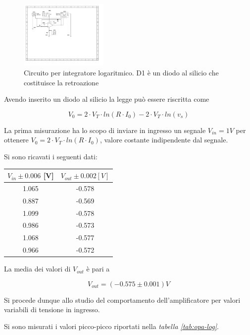 \documentclass[journal]{IEEEtran}
\begin{document}
\begin{figure}[H]%
\begin {center}
\includegraphics[width=0.38\textwidth]{sch-simulations/output/OPA-log.pdf}
\caption{Circuito per integratore logaritmico. D1 è un diodo al silicio che costituisce la retroazione}
\label{fig:circ_log_ampl}
\end {center}
\end{figure}

Avendo inserito un diodo al silicio la legge può essere riscritta come 

\begin{equation}
V_0 = 2 \cdot V_T \cdot ln(R \cdot I_0) - 2 \cdot V_T \cdot ln(v_s)
\end{equation}

La prima misurazione ha lo scopo di inviare in ingresso un segnale $V_{in} = 1V$ per ottenere  $V_0 = 2 \cdot V_T \cdot ln(R \cdot I_0)$, valore costante indipendente dal segnale.

Si sono ricavati i seguenti dati:

\begin{center}
\begin{tabular}{|c|c|}
\hline
$V_{in} \pm 0.006 $ [V] & $V_{out} \pm 0.002 [V]$   \\ \hline
1.065 & -0.578 \\ \hline
0.887 & -0.569 \\ \hline
1.099 & -0.578 \\ \hline
0.986 & -0.573 \\ \hline
1.068 & -0.577 \\ \hline
0.966 & -0.572 \\ \hline
\end{tabular}
\end{center}

La media dei valori di $V_{out}$ è pari a 

\[V_{out} = (-0.575 \pm 0.001 )V\]

Si procede dunque allo studio del comportamento dell'amplificatore per valori variabili di tensione in ingresso.

Si sono misurati i valori picco-picco riportati nella \textit{tabella \ref{tab:opa-log}}.
\end{document}
